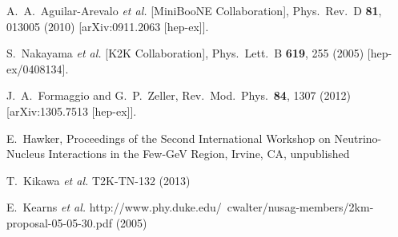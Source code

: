 \documentclass[%
reprint,
superscriptaddress,
 amsmath,amssymb,
 aps,
floatfix,
]{revtex4-1}
\begin{document}
\begin{thebibliography}{99}
  A.~A.~Aguilar-Arevalo {\it et al.}  [MiniBooNE Collaboration],
  Phys.\ Rev.\ D {\bf 81}, 013005 (2010)
  [arXiv:0911.2063 [hep-ex]].

  S.~Nakayama {\it et al.}  [K2K Collaboration],
  Phys.\ Lett.\ B {\bf 619}, 255 (2005)
  [hep-ex/0408134].

  J.~A.~Formaggio and G.~P.~Zeller,
  Rev.\ Mod.\ Phys.\  {\bf 84}, 1307 (2012)
  [arXiv:1305.7513 [hep-ex]].

  E.~Hawker,  Proceedings of the Second International Workshop on Neutrino-Nucleus Interactions in the Few-GeV Region, Irvine, CA, unpublished

  T.~Kikawa {\it et al.}
  T2K-TN-132 (2013)

  E.~Kearns {\it et al.}
  http://www.phy.duke.edu/~cwalter/nusag-members/2km-proposal-05-05-30.pdf
  (2005)

\end{thebibliography} 

\newpage

\appendix


\end{document}
